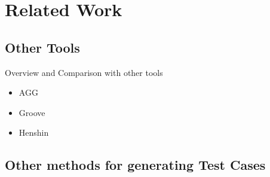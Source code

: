 \chapter{Related Work}\label{ch:related-work}

\section{Other Tools}

Overview and Comparison with other tools

\begin{itemize}
\item AGG
\item Groove
\item Henshin
\end{itemize}

\section{Other methods for generating Test Cases}
